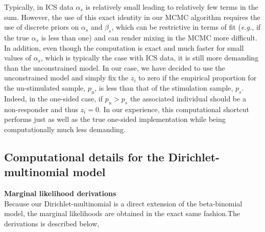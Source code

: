 \documentclass{article}
\begin{document}
Typically, in ICS data $\alpha_s$ is relatively small leading to relatively few terms in the sum. However, the use of this exact identity in our MCMC algorithm requires the use of discrete priors on $\alpha_s$ and $\beta_s$, which can be restrictive in terms of fit (\textit{e.g.},  if the true $\alpha_s$ is less than one) and can render mixing in the MCMC more difficult. In addition, even though the computation is exact and much faster for small values of $\alpha_s$, which is typically the case with ICS data, it is still more demanding than the unconstrained model. In our case, we have decided to use the unconstrained model and simply fix the $z_i$ to zero if the empirical proportion for the un-stimulated sample, $p_u$, is less than that of the stimulation sample, $p_s$. Indeed, in the one-sided case, if $p_u>p_s$ the associated individual should be a non-responder and thus $z_i=0$. In our experience, this computational shortcut performs just as well as the true one-sided implementation while being computationally much less demanding.  

\subsection{Computational details for the Dirichlet-multinomial model}
\noindent\textbf{Marginal likelihood derivations}\\
Because our Dirichlet-multinomial is a direct extension of the beta-binomial model, the marginal likelihoods are obtained in the exact same fashion.The derivations is described below,
\end{document}
